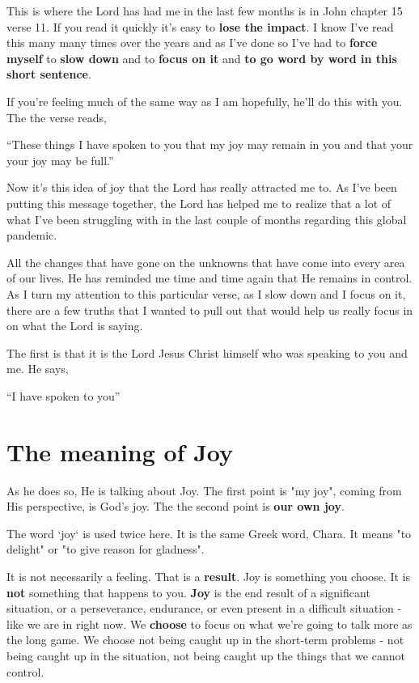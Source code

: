 \documentclass[11pt]{article} %
\begin{document}
This is where the Lord has had me in the last few months is in John chapter 15 verse 11.  If you read it quickly
it's easy to \textbf{lose the impact}. I know I've read this many many times over the years and as I've done so
I've had to \textbf{force myself} to \textbf{slow down} and to \textbf{focus on it} and
 \textbf{to go word by word in this short sentence}.

If you're feeling much of the same way as I am hopefully, he'll do this with you. The the verse reads,

``These things I have spoken to you that my joy may remain in you and that your your joy may be full.''

Now it's this idea of joy that the Lord has really attracted me to. As I've been putting this message together,
the Lord has helped me to realize that a lot of what I've been struggling with in the last couple of months
regarding this global pandemic.

All the changes that have gone on the unknowns that have come into every area of our lives. He has
reminded me time and time again that He remains in control. As I turn my attention to this particular
verse, as I slow down and I focus on it, there are a few truths that I wanted to pull out that would help
us really focus in on what the Lord is saying.

The first is that it is the Lord Jesus Christ himself who was speaking to you and me. He says,

``I have spoken to you''

\section{The meaning of Joy}

As he does so, He is talking about Joy. The first point is "my joy", coming from His perspective, is God's joy.
The the second point is \textbf{our own joy}.

The word `joy` is used twice here. It is the same Greek word, Chara.  It means "to delight" or
"to give reason for gladness".

It is not necessarily a feeling. That is a \textbf{result}. Joy is something you choose. It is \textbf{not}
something that happens to you. \textbf{Joy} is the end result of a significant situation, or a perseverance,
endurance, or even present in a difficult situation -  like we are in right now. We \textbf{choose} to focus
on what we're going to talk more as the long game. We choose not being caught up in the short-term
problems - not being caught up in the situation, not being caught up the things that we cannot control.
\end{document}
